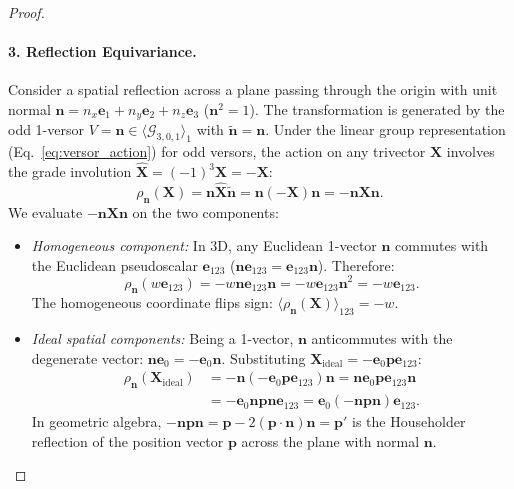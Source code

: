 \documentclass[10pt]{article}
\begin{document}
\begin{proof}
\paragraph{3. Reflection Equivariance.}
Consider a spatial reflection across a plane passing through the origin with unit normal $\mathbf{n} = n_x \mathbf{e}_1 + n_y \mathbf{e}_2 + n_z \mathbf{e}_3$ ($\mathbf{n}^2 = 1$). The transformation is generated by the odd 1-versor $V = \mathbf{n} \in \langle \mathcal{G}_{3,0,1} \rangle_1$ with $\widetilde{\mathbf{n}} = \mathbf{n}$.
Under the linear group representation (Eq.~\ref{eq:versor_action}) for odd versors, the action on any trivector $\mathbf{X}$ involves the grade involution $\widehat{\mathbf{X}} = (-1)^3 \mathbf{X} = -\mathbf{X}$:
\begin{equation}
    \rho_{\mathbf{n}}(\mathbf{X}) = \mathbf{n} \widehat{\mathbf{X}} \widetilde{\mathbf{n}} = \mathbf{n} (-\mathbf{X}) \mathbf{n} = -\mathbf{n} \mathbf{X} \mathbf{n}.
\end{equation}
We evaluate $-\mathbf{n} \mathbf{X} \mathbf{n}$ on the two components:
\begin{itemize}
    \item \emph{Homogeneous component:} In 3D, any Euclidean 1-vector $\mathbf{n}$ commutes with the Euclidean pseudoscalar $\mathbf{e}_{123}$ ($\mathbf{n} \mathbf{e}_{123} = \mathbf{e}_{123} \mathbf{n}$). Therefore:
    \begin{equation}
        \rho_{\mathbf{n}}(w \mathbf{e}_{123}) = -w \mathbf{n} \mathbf{e}_{123} \mathbf{n} = -w \mathbf{e}_{123} \mathbf{n}^2 = -w \mathbf{e}_{123}.
    \end{equation}
    The homogeneous coordinate flips sign: $\langle \rho_{\mathbf{n}}(\mathbf{X}) \rangle_{123} = -w$.
    \item \emph{Ideal spatial components:} Being a 1-vector, $\mathbf{n}$ anticommutes with the degenerate vector: $\mathbf{n} \mathbf{e}_0 = -\mathbf{e}_0 \mathbf{n}$.
    Substituting $\mathbf{X}_{\text{ideal}} = -\mathbf{e}_0 \mathbf{p} \mathbf{e}_{123}$:
    \begin{align}
        \rho_{\mathbf{n}}(\mathbf{X}_{\text{ideal}}) 
        &= -\mathbf{n} (-\mathbf{e}_0 \mathbf{p} \mathbf{e}_{123}) \mathbf{n} = \mathbf{n} \mathbf{e}_0 \mathbf{p} \mathbf{e}_{123} \mathbf{n} \nonumber \\
        &= -\mathbf{e}_0 \mathbf{n} \mathbf{p} \mathbf{n} \mathbf{e}_{123} = \mathbf{e}_0 (-\mathbf{n} \mathbf{p} \mathbf{n}) \mathbf{e}_{123}.
    \end{align}
    In geometric algebra, $-\mathbf{n} \mathbf{p} \mathbf{n} = \mathbf{p} - 2(\mathbf{p} \cdot \mathbf{n})\mathbf{n} = \mathbf{p}'$ is the Householder reflection of the position vector $\mathbf{p}$ across the plane with normal $\mathbf{n}$.

\end{itemize}
\end{proof}
\end{document}
